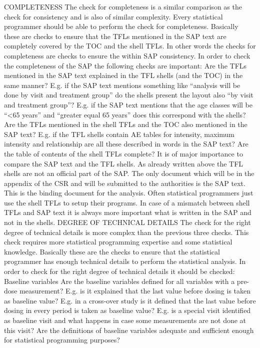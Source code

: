 COMPLETENESS
The check for completeness is a similar comparison as the check for consistency and is also of similar complexity. Every statistical programmer should be able to perform the check for completeness. Basically these are checks to ensure that the TFLs mentioned in the SAP text are completely covered by the TOC and the shell TFLs. In other words the checks for completeness are checks to ensure the within SAP consistency. In order to check the completeness of the SAP the following checks are important:
Are the TFLs mentioned in the SAP text explained in the TFL shells (and the TOC) in the same manner?
E.g. if the SAP text mentions something like “analysis will be done by visit and treatment group” do the shells present the layout also “by visit and treatment group”?
E.g. if the SAP text mentions that the age classes will be “<65 years” and “greater equal 65 years” does this correspond with the shells?
Are the TFLs mentioned in the shell TFLs and the TOC also mentioned in the SAP text?
E.g. if the TFL shells contain AE tables for intensity, maximum intensity and relationship are all these described in words in the SAP text?
Are the table of contents of the shell TFLs complete?
It is of major importance to compare the SAP text and the TFL shells. As already written above the TFL shells are not an official part of the SAP. The only document which will be in the appendix of the CSR and will be submitted to the authorities is the SAP text. This is the binding document for the analysis. Often statistical programmers just use the shell TFLs to setup their programs. In case of a mismatch between shell TFLs and SAP text it is always more important what is written in the SAP and not in the shells. DEGREE OF TECHNICAL DETAILS The check for the right degree of technical details is more complex than the previous three checks. This check requires more statistical programming expertise and some statistical knowledge. Basically these are the checks to ensure that the statistical programmer has enough technical details to perform the statistical analysis. In order to check for the right degree of technical details it should be checked:
Baseline variables
Are the baseline variables defined for all variables with a pre-dose measurement?
E.g. is it explained that the last value before dosing is taken as baseline value?
E.g. in a cross-over study is it defined that the last value before dosing in every period is taken as baseline value?
E.g. is a special visit identified as baseline visit and what happens in case some measurements are not done at this visit?
Are the definitions of baseline variables adequate and sufficient enough for statistical programming purposes?

